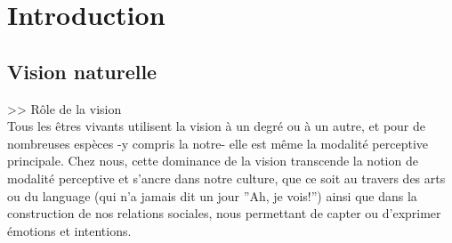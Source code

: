 
\chapter{Introduction} %
\label{Introduction} %


\newcommand{\keyword}[1]{\textbf{#1}}
\newcommand{\tabhead}[1]{\textbf{#1}}
\newcommand{\code}[1]{\texttt{#1}}
\newcommand{\file}[1]{\texttt{\bfseries#1}}
\newcommand{\option}[1]{\texttt{\itshape#1}}


\section{Vision naturelle}
>> Rôle de la vision\\
Tous  les êtres vivants utilisent la vision à un degré ou à un autre, et pour de nombreuses espèces -y compris la notre- elle est même la modalité perceptive principale. Chez nous, cette dominance de la vision transcende la notion de modalité perceptive et s'ancre dans notre culture, que ce soit au travers des arts ou du language (qui n'a jamais dit un jour ''Ah, je vois!'') ainsi que dans la construction de nos relations sociales, nous permettant de capter ou d'exprimer émotions et intentions.\\

